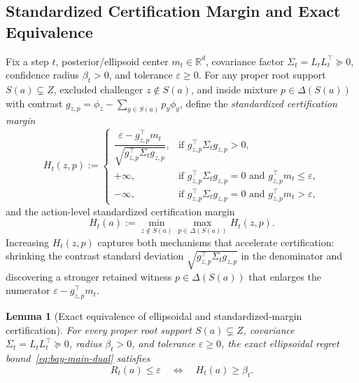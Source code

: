 \documentclass{article}
\theoremstyle{plain}
\newtheorem{lemma}[theorem]{Lemma}
\theoremstyle{definition}
\begin{document}
\subsection{Standardized Certification Margin and Exact Equivalence}
\label{app:ma-equivalence}

Fix a step $t$, posterior/ellipsoid center $m_t \in \mathbb{R}^d$, covariance factor $\Sigma_t = L_t L_t^\top \succeq 0$, confidence radius $\beta_t > 0$, and tolerance $\varepsilon \ge 0$. For any proper root support $S(a) \subsetneq Z$, excluded challenger $z \notin S(a)$, and inside mixture $p \in \Delta(S(a))$ with contrast $g_{z,p} = \phi_z - \sum_{y \in S(a)} p_y \phi_y$, define the \emph{standardized certification margin}
\begin{equation}
  H_t(z, p)
  := \begin{cases}
    \dfrac{\varepsilon - g_{z,p}^\top m_t}{\sqrt{g_{z,p}^\top \Sigma_t g_{z,p}}}, & \text{if } g_{z,p}^\top \Sigma_t g_{z,p} > 0,\\[8pt]
    +\infty, & \text{if } g_{z,p}^\top \Sigma_t g_{z,p} = 0 \text{ and } g_{z,p}^\top m_t \le \varepsilon,\\
    -\infty, & \text{if } g_{z,p}^\top \Sigma_t g_{z,p} = 0 \text{ and } g_{z,p}^\top m_t > \varepsilon,
  \end{cases}
  \label{eq:ma-std-margin}
\end{equation}
and the action-level standardized certification margin
\begin{equation}
  H_t(a) := \min_{z \notin S(a)} \max_{p \in \Delta(S(a))} H_t(z, p).
  \label{eq:ma-action-margin}
\end{equation}
Increasing $H_t(z, p)$ captures both mechanisms that accelerate certification: shrinking the contrast standard deviation $\sqrt{g_{z,p}^\top \Sigma_t g_{z,p}}$ in the denominator and discovering a stronger retained witness $p \in \Delta(S(a))$ that enlarges the numerator $\varepsilon - g_{z,p}^\top m_t$.

\begin{lemma}[Exact equivalence of ellipsoidal and standardized-margin certification]
\label{lem:ma-equivalence}
For every proper root support $S(a) \subsetneq Z$, covariance $\Sigma_t = L_t L_t^\top \succeq 0$, radius $\beta_t > 0$, and tolerance $\varepsilon \ge 0$, the exact ellipsoidal regret bound~\eqref{eq:bay-main-dual} satisfies
\begin{equation}
  R_t(a) \le \varepsilon \quad\Longleftrightarrow\quad H_t(a) \ge \beta_t.
  \label{eq:ma-equiv}
\end{equation}
\end{lemma}
\end{document}
